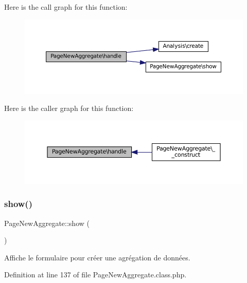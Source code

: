 Here is the call graph for this function\+:\nopagebreak
\begin{figure}[H]
\begin{center}
\leavevmode
\includegraphics[width=350pt]{class_page_new_aggregate_a5ceaf2dbf2a63f97181ae557f50908e4_cgraph}
\end{center}
\end{figure}
Here is the caller graph for this function\+:\nopagebreak
\begin{figure}[H]
\begin{center}
\leavevmode
\includegraphics[width=350pt]{class_page_new_aggregate_a5ceaf2dbf2a63f97181ae557f50908e4_icgraph}
\end{center}
\end{figure}
\mbox{\label{class_page_new_aggregate_ae12848a7d266fbce4b447698cfc5f4df}} 
\subsubsection{\texorpdfstring{show()}{show()}}
{\footnotesize\ttfamily Page\+New\+Aggregate\+::show (\begin{DoxyParamCaption}{ }\end{DoxyParamCaption})\hspace{0.3cm}{\ttfamily [protected]}}

Affiche le formulaire pour créer une agrégation de données. 

Definition at line 137 of file Page\+New\+Aggregate.\+class.\+php.



